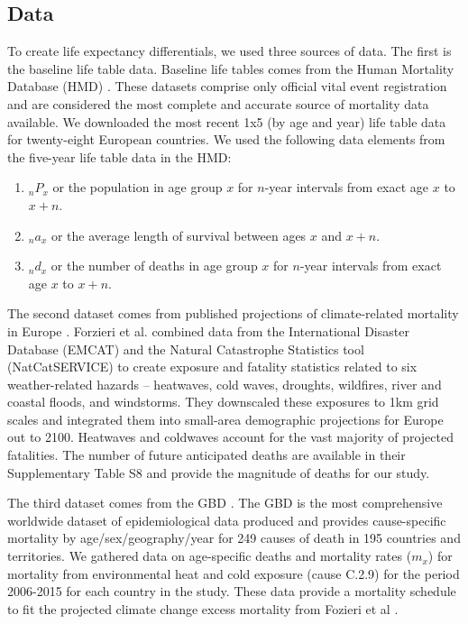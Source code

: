 \documentclass[12pt,]{article}
\begin{document}
\subsection{Data}\label{data}

To create life expectancy differentials, we used three sources of data.
The first is the baseline life table data. Baseline life tables comes
from the Human Mortality Database (HMD) \citep{HMD}. These datasets
comprise only official vital event registration and are considered the
most complete and accurate source of mortality data available. We
downloaded the most recent 1x5 (by age and year) life table data for
twenty-eight European countries. We used the following data elements
from the five-year life table data in the HMD:

\begin{enumerate}
\item $_nP_x$ or the population in age group $x$ for $n$-year intervals from exact age $x$ to $x+n$.
\item $_na_x$ or the average length of survival between ages $x$ and $x+n$.
\item $_nd_x$ or the number of deaths in age group $x$ for $n$-year intervals from exact age $x$ to $x+n$.
\end{enumerate}

The second dataset comes from published projections of climate-related
mortality in Europe \citep{forzieri2017increasing}. Forzieri et al.
\citep{forzieri2017increasing} combined data from the International
Disaster Database (EMCAT) and the Natural Catastrophe Statistics tool
(NatCatSERVICE) to create exposure and fatality statistics related to
six weather-related hazards -- heatwaves, cold waves, droughts,
wildfires, river and coastal floods, and windstorms. They downscaled
these exposures to 1km grid scales and integrated them into small-area
demographic projections for Europe out to 2100. Heatwaves and coldwaves
account for the vast majority of projected fatalities. The number of
future anticipated deaths are available in their Supplementary Table S8
\citep{forzieri2017increasing} and provide the magnitude of deaths for
our study.

The third dataset comes from the GBD \citep{GBD, wang2012age}. The GBD
is the most comprehensive worldwide dataset of epidemiological data
produced and provides cause-specific mortality by age/sex/geography/year
for 249 causes of death in 195 countries and territories. We gathered
data on age-specific deaths and mortality rates (\(m_x\)) for mortality
from environmental heat and cold exposure (cause C.2.9) for the period
2006-2015 for each country in the study. These data provide a mortality
schedule to fit the projected climate change excess mortality from
Fozieri et al \citep{forzieri2017increasing}.
\end{document}
